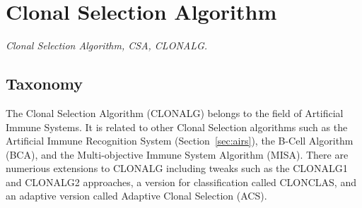 

\section{Clonal Selection Algorithm} 
\label{sec:clonal_selection_algorithm}

\emph{Clonal Selection Algorithm, CSA, CLONALG.}

\subsection{Taxonomy}
The Clonal Selection Algorithm (CLONALG) belongs to the field of Artificial Immune Systems.
It is related to other Clonal Selection algorithms such as the Artificial Immune Recognition System (Section~\ref{sec:airs}), the B-Cell Algorithm (BCA), and the Multi-objective Immune System Algorithm (MISA).
There are numerious extensions to CLONALG including tweaks such as the CLONALG1 and CLONALG2 approaches, a version for classification called CLONCLAS,  and an adaptive version called Adaptive Clonal Selection (ACS).

